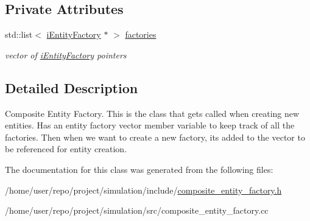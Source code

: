 \subsection*{Private Attributes}
\begin{DoxyCompactItemize}
\item 
\mbox{\label{classCompositeEntityFactory_a7dec8bde43fb44220a757c45eaa00435}} 
std\+::list$<$ \hyperlink{classiEntityFactory}{i\+Entity\+Factory} $\ast$ $>$ \hyperlink{classCompositeEntityFactory_a7dec8bde43fb44220a757c45eaa00435}{factories}
\begin{DoxyCompactList}\small\item\em vector of \hyperlink{classiEntityFactory}{i\+Entity\+Factory} pointers \end{DoxyCompactList}\end{DoxyCompactItemize}


\subsection{Detailed Description}
Composite Entity Factory. This is the class that get\textquotesingle{}s called when creating new entities. Has an entity factory vector member variable to keep track of all the factories. Then when we want to create a new factory, it\textquotesingle{}s added to the vector to be referenced for entity creation. 

The documentation for this class was generated from the following files\+:\begin{DoxyCompactItemize}
\item 
/home/user/repo/project/simulation/include/\hyperlink{composite__entity__factory_8h}{composite\+\_\+entity\+\_\+factory.\+h}\item 
/home/user/repo/project/simulation/src/composite\+\_\+entity\+\_\+factory.\+cc\end{DoxyCompactItemize}
